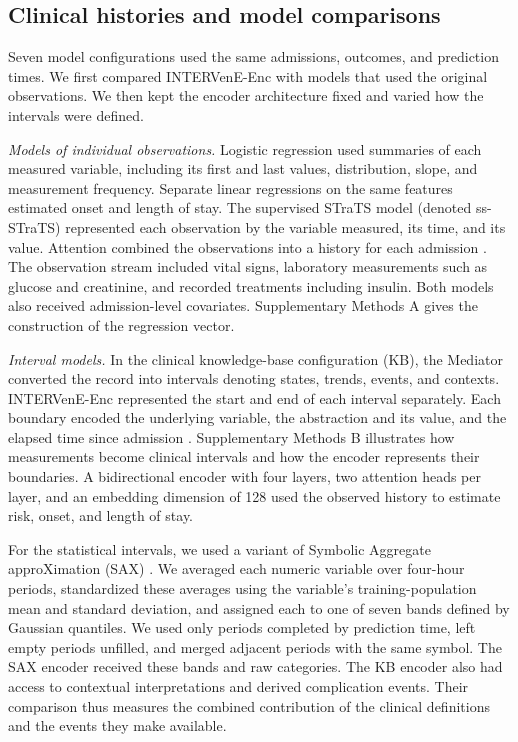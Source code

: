 \subsection{Clinical histories and model comparisons}
\label{sec:methods-ladder}
Seven model configurations used the same admissions, outcomes, and prediction times. We first compared INTERVenE-Enc with models that used the original observations. We then kept the encoder architecture fixed and varied how the intervals were defined.

\emph{Models of individual observations.} Logistic regression used summaries of each measured variable, including its first and last values, distribution, slope, and measurement frequency. Separate linear regressions on the same features estimated onset and length of stay. The supervised STraTS model (denoted ss-STraTS) represented each observation by the variable measured, its time, and its value. Attention combined the observations into a history for each admission \citep{tipirneni2022strats}. The observation stream included vital signs, laboratory measurements such as glucose and creatinine, and recorded treatments including insulin. Both models also received admission-level covariates. Supplementary Methods A gives the construction of the regression vector.

\emph{Interval models.} In the clinical knowledge-base configuration (KB), the Mediator converted the record into intervals denoting states, trends, events, and contexts. INTERVenE-Enc represented the start and end of each interval separately. Each boundary encoded the underlying variable, the abstraction and its value, and the elapsed time since admission \citep{oded2026intervene,kazemi2019time2vec}. Supplementary Methods B illustrates how measurements become clinical intervals and how the encoder represents their boundaries. A bidirectional encoder with four layers, two attention heads per layer, and an embedding dimension of 128 used the observed history to estimate risk, onset, and length of stay.

For the statistical intervals, we used a variant of Symbolic Aggregate approXimation (SAX) \citep{lin2003symbolic}. We averaged each numeric variable over four-hour periods, standardized these averages using the variable's training-population mean and standard deviation, and assigned each to one of seven bands defined by Gaussian quantiles. We used only periods completed by prediction time, left empty periods unfilled, and merged adjacent periods with the same symbol. The SAX encoder received these bands and raw categories. The KB encoder also had access to contextual interpretations and derived complication events. Their comparison thus measures the combined contribution of the clinical definitions and the events they make available.

